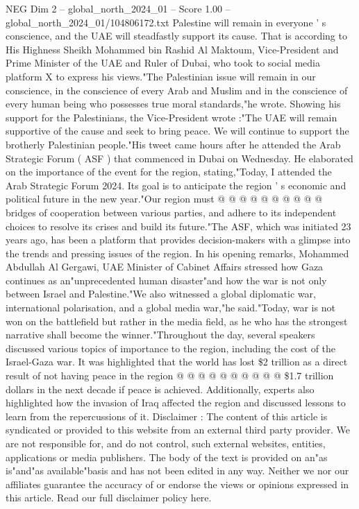 \begin{textsample}{NEG Dim 2 – global\_north\_2024\_01 – Score 1.00 – global\_north\_2024\_01/104806172.txt}  \label{ex:f2_neg_339}
Palestine will remain in everyone ' s conscience, and the UAE will steadfastly support its cause.
That is according to His Highness Sheikh Mohammed bin Rashid Al Maktoum, Vice-President and Prime Minister of the UAE and Ruler of Dubai, who took to social media platform X to express his views."The Palestinian issue will remain in our conscience, in the conscience of every Arab and Muslim and in the conscience of every human being who possesses true moral standards,"he wrote.
Showing his support for the Palestinians, the Vice-President wrote :"The UAE will remain supportive of the cause and seek to bring peace.
We will continue to support the brotherly Palestinian people."His tweet came hours after he attended the Arab Strategic Forum ( ASF ) that commenced in Dubai on Wednesday.
He elaborated on the importance of the event for the region, stating,"Today, I attended the Arab Strategic Forum 2024.
Its goal is to anticipate the region ' s economic and political future in the new year."Our region must @ @ @ @ @ @ @ @ @ @ bridges of cooperation between various parties, and adhere to its independent choices to resolve its crises and build its future."The ASF, which was initiated 23 years ago, has been a platform that provides decision-makers with a glimpse into the trends and pressing issues of the region.
In his opening remarks, Mohammed Abdullah Al Gergawi, UAE Minister of Cabinet Affairs stressed how Gaza continues as an"unprecedented human disaster"and how the war is not only between Israel and Palestine."We also witnessed a global diplomatic war, international polarisation, and a global media war,"he said."Today, war is not won on the battlefield but rather in the media field, as he who has the strongest narrative shall become the winner."Throughout the day, several speakers discussed various topics of importance to the region, including the cost of the Israel-Gaza war.
It was highlighted that the world has lost \$2 trillion as a direct result of not having peace in the region @ @ @ @ @ @ @ @ @ @ \$1.7 trillion dollars in the next decade if peace is achieved.
Additionally, experts also highlighted how the invasion of Iraq affected the region and discussed lessons to learn from the repercussions of it.
Disclaimer : The content of this article is syndicated or provided to this website from an external third party provider.
We are not responsible for, and do not control, such external websites, entities, applications or media publishers.
The body of the text is provided on an"as is"and"as available"basis and has not been edited in any way.
Neither we nor our affiliates guarantee the accuracy of or endorse the views or opinions expressed in this article.
Read our full disclaimer policy here.

\end{textsample}
